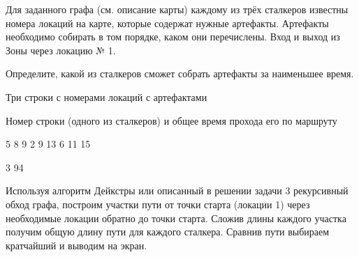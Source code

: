 
Для заданного графа (см. описание карты) каждому из трёх сталкеров известны номера локаций на карте, которые содержат нужные артефакты. Артефакты необходимо собирать в том порядке, каком они перечислены. Вход и выход из Зоны через локацию № 1.

Определите, какой из сталкеров сможет собрать артефакты за наименьшее время.


Три строки с номерами локаций с артефактами

\outputfmtSection

Номер строки (одного из сталкеров) и общее время прохода его по маршруту

\begin{myverbbox}[\small]{\vinput}
    5 8 9
    2 9 13
    6 11 15
\end{myverbbox}
\begin{myverbbox}[\small]{\voutput}
    3 94
\end{myverbbox}

\explanationSection

Используя алгоритм Дейкстры или описанный в решении задачи 3 рекурсивный обход графа, построим участки пути от точки старта (локации 1) через необходимые локации обратно до точки старта. Сложив длины каждого участка получим общую длину пути для каждого сталкера. Сравнив пути выбираем кратчайший и выводим на экран.

